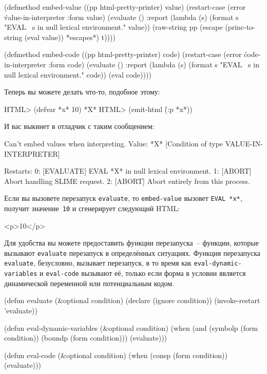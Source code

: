 \begin{myverb}
(defmethod embed-value ((pp html-pretty-printer) value)
  (restart-case (error \'value-in-interpreter :form value)
    (evaluate ()
      :report (lambda (s) (format s "EVAL ~s in null lexical environment." value))
      (raw-string pp (escape (princ-to-string (eval value)) *escapes*) t))))

(defmethod embed-code ((pp html-pretty-printer) code)
  (restart-case (error \'code-in-interpreter :form code)
    (evaluate ()
      :report (lambda (s) (format s "EVAL ~s in null lexical environment." code))
      (eval code))))
\end{myverb}

Теперь вы можете делать что-то, подобное этому:

\begin{myverb}
HTML> (defvar *x* 10)
*X*
HTML> (emit-html \'(:p *x*))
\end{myverb}

\noindent{}И вас выкинет в отладчик с таким сообщением:

\begin{myverb}
Can't embed values when interpreting. Value: *X*
   [Condition of type VALUE-IN-INTERPRETER]

Restarts:
  0: [EVALUATE] EVAL *X* in null lexical environment.
  1: [ABORT] Abort handling SLIME request.
  2: [ABORT] Abort entirely from this process.
\end{myverb}

Если вы вызовете перезапуск \lstinline{evaluate}, то \lstinline{embed-value} вызовет
\lstinline{EVAL *x*}, получит значение~\lstinline{10} и сгенерирует следующий HTML:

\begin{myverb}
<p>10</p>
\end{myverb}

Для удобства вы можете предоставить функции перезапуска~-- функции, которые вызывают
\lstinline{evaluate} перезапуск в определённых ситуациях. Функция перезапуска
\lstinline{evaluate}, безусловно, вызывает перезапуск, в то время как
\lstinline{eval-dynamic-variables} и \lstinline{eval-code} вызывают её, только если форма в
условии является динамической переменной или потенциальным кодом.

\begin{myverb}
(defun evaluate (\&{}optional condition)
  (declare (ignore condition))
  (invoke-restart 'evaluate))

(defun eval-dynamic-variables (\&{}optional condition)
  (when (and (symbolp (form condition)) (boundp (form condition)))
    (evaluate)))

(defun eval-code (\&{}optional condition)
  (when (consp (form condition))
    (evaluate)))
\end{myverb}

